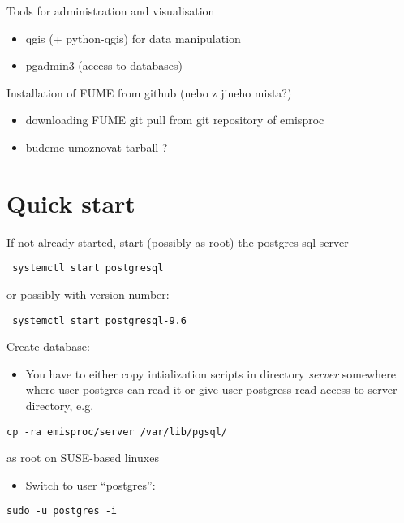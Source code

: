 \documentclass[a4paper,11pt]{article}
\begin{document}
Tools for administration and visualisation

\begin{itemize}
\item
  qgis (+ python-qgis) for data manipulation
\item
  pgadmin3 (access to databases)
\end{itemize}

Installation of FUME from github (nebo z jineho mista?)

\begin{itemize}
\item
  downloading FUME git pull from git repository of emisproc
\item
  budeme umoznovat tarball ?
\end{itemize}

\section{Quick start}\label{quick-start}

If not already started, start (possibly as root) the postgres sql server

\begin{verbatim}
 systemctl start postgresql 
\end{verbatim}
or possibly with version number: 
\begin{verbatim}
 systemctl start postgresql-9.6
\end{verbatim}


Create database:

\begin{itemize}
\item
  You have to either copy intialization scripts in directory
  \emph{server} somewhere where user postgres can read it or give user
  postgress read access to server directory, e.g.
\end{itemize}

\begin{verbatim}
cp -ra emisproc/server /var/lib/pgsql/
\end{verbatim}

as root on SUSE-based linuxes

\begin{itemize}
\item
  Switch to user ``postgres'':
\end{itemize}

\begin{verbatim}
sudo -u postgres -i
\end{verbatim}
\end{document}
